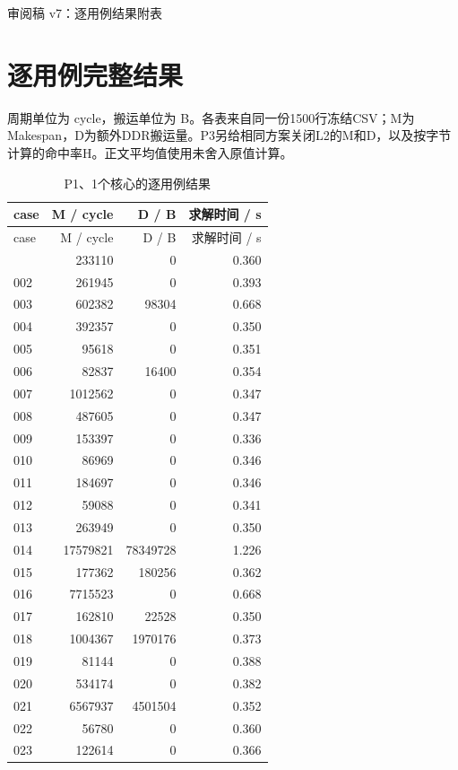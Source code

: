 \documentclass[anonymous,notoc]{gmcm2026}
\begin{document}
\pagestyle{plain}\begin{center}\large 审阅稿 v7：逐用例结果附表\end{center}
\section{逐用例完整结果}
周期单位为 cycle，搬运单位为 B。各表来自同一份1500行冻结CSV；M为Makespan，D为额外DDR搬运量。P3另给相同方案关闭L2的M和D，以及按字节计算的命中率H。正文平均值使用未舍入原值计算。

\begin{longtable}{lrrr}
\caption{P1、1个核心的逐用例结果}\\
\toprule
case & M / cycle & D / B & 求解时间 / s\\\midrule
\endfirsthead
\toprule
case & M / cycle & D / B & 求解时间 / s\\\midrule
\endhead
\bottomrule\endfoot
001 & 233110 & 0 & 0.360 \\
002 & 261945 & 0 & 0.393 \\
003 & 602382 & 98304 & 0.668 \\
004 & 392357 & 0 & 0.350 \\
005 & 95618 & 0 & 0.351 \\
006 & 82837 & 16400 & 0.354 \\
007 & 1012562 & 0 & 0.347 \\
008 & 487605 & 0 & 0.347 \\
009 & 153397 & 0 & 0.336 \\
010 & 86969 & 0 & 0.346 \\
011 & 184697 & 0 & 0.346 \\
012 & 59088 & 0 & 0.341 \\
013 & 263949 & 0 & 0.350 \\
014 & 17579821 & 78349728 & 1.226 \\
015 & 177362 & 180256 & 0.362 \\
016 & 7715523 & 0 & 0.668 \\
017 & 162810 & 22528 & 0.350 \\
018 & 1004367 & 1970176 & 0.373 \\
019 & 81144 & 0 & 0.388 \\
020 & 534174 & 0 & 0.382 \\
021 & 6567937 & 4501504 & 0.352 \\
022 & 56780 & 0 & 0.360 \\
023 & 122614 & 0 & 0.366 \\

\end{longtable}
\end{document}
